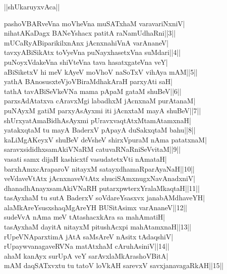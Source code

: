 \documentclass{article}
\begin{document}
\begin{center}
||shUkaruyxvAca||
\end{center}

pashoVBARveVna moVheVna muSATxhaM varavariNxniV|\\
nihatAKaDagx BANeYshacx patitA raNamUdhaRni||3||\\
mUCaRyABiparikilxnAnx jAcnxnahiVnA varAnaneV|\\
tavxyABiSikAtx toVyeVna puNayxhasetxVna suMdari||4||\\
puNoyxVdakeVna shiVteVna tava hasatxgateVna veY|\\
aBiSiketxV hi meV kAyeV moVhoV naSoTxV vihAya mAM||5||\\
yathA BAnosusxteVjoVBiraMdhakAraH parxyAti saH|\\
tathA tavABiSeVkeVNa mama pApaM gataM shuBeV||6||\\
parxsAdAtatxva cAravxMgi labadhxM jAcnxnaM purAtanaM|\\
puNAyxM gatiM parxyAsAyxmi iti jAcnxtaM mayA shuBeV||7||\\
shUrxyatAmaBidhAsAyxmi pUravxvaqtAtxMtamAtamxnaH|\\
yatakxqtaM tu mayA BaderxV pApayA duSakxqtaM bahu||8||\\
kaLiMgAKeyxV shuBeV deVsheV shirxVpuraM nAma patatxnaM|\\
saravxsididhxsamAkiVNaRM catuvaRNaRniSeVvitaM||9||\\
vasati samx dijaH kashicxtf vasudatetxVti nAmataH|\\
barxhAmxcAraparoV nitayxM satayxdhamaRparAyaNaH||10||\\
veVdaveVtAtx jAcnxnaveVtAtx shuciSAmxnugxNavAnadxniV|\\
dhanadhAnayxsamAkiVNaRH putarxpwterxYralaMkaqtaH||11||\\
tasAyxhaM tu sutA BaderxV soVdareYsasxvx janabAMdhaveYH|\\
alaMkAreYsusxshaqMgAreYH BUSitAsimx varAnaneV||12||\\
sudeVvA nAma meV tAtashacxkAra sa mahAmatiH|\\
tasAyxhaM dayitA nitayxM pitushAcxpi mahAtamxnaH||13||\\
rUpeVNAparxtimA jAtA saMsAreV nAsitx tAdaqshiV|\\
rUpaywvanagaveRVNa matAtxhaM cAruhAsiniV||14||\\
ahaM kanAyx surUpA veY sarAvxlaMkArashoVBitA|\\
mAM daqSATxvxtu tu tatoV loVkAH sarevxV savxjanavagaRkAH||15||\\
\end{document}
